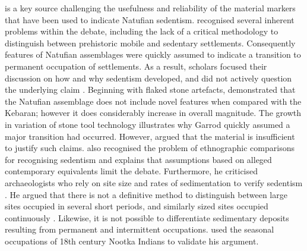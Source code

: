 \documentclass[%
	]{ijsra}
\begin{document}
\textcite{Edwards_1989} is a key source challenging the usefulness and reliability of the material markers that have been used to indicate Natufian sedentism. 
\parencite[8]{Edwards_1989} recognised several inherent problems within the debate, including the lack of a critical methodology to distinguish between prehistoric mobile and sedentary settlements. Consequently features of Natufian assemblages were quickly assumed to indicate a transition to permanent occupation of settlements. 
As a result, scholars focused their discussion on how and why sedentism developed, and did not actively question the underlying claim \parencite[8]{Edwards_1989}. 
Beginning with flaked stone artefacts, \textcite[11]{Edwards_1989} demonstrated that the Natufian assemblage does not include novel features when compared with the Kebaran; however it does considerably increase in overall magnitude. 
The growth in variation of stone tool technology illustrates why Garrod quickly assumed a major transition had occurred. However, \textcite[11]{Edwards_1989} argued that the material is insufficient to justify such claims. 
\textcite[15]{Edwards_1989} also recognised the problem of ethnographic comparisons for recognising sedentism and explains that assumptions based on alleged contemporary equivalents limit the debate. 
Furthermore, he criticised archaeologists who rely on site size and rates of sedimentation to verify sedentism \parencite[15]{Edwards_1989}. 
He argued that there is not a definitive method to distinguish between large sites occupied in several short periods, and similarly sized sites occupied continuously \parencite[15]{Edwards_1989}. 
Likewise, it is not possible to differentiate sedimentary deposits resulting from permanent and intermittent occupations. \textcite[15]{Edwards_1989} used the seasonal occupations of 18th century Nootka Indians to validate his argument. 
\end{document}

